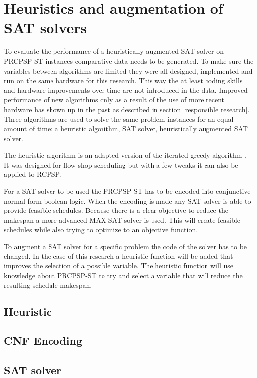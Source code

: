 \section{Heuristics and augmentation of SAT solvers}
To evaluate the performance of a heuristically augmented SAT solver on PRCPSP-ST instances comparative data needs to be generated.  To make sure the variables between algorithms are limited they were all designed, implemented and run on the same hardware for this research. This way the at least coding skills and hardware improvements over time are not introduced in the data. Improved performance of new algorithms only as a result of the use of more recent hardware has shown up in the past as described in section \ref{responsible research}. Three algorithms are used to solve the same problem instances for an equal amount of time: a heuristic algorithm, SAT solver, heuristically augmented SAT solver.

The heuristic algorithm is an adapted version of the iterated greedy algorithm \cite{RN32}. It was designed for flow-shop scheduling but with a few tweaks it can also be applied to RCPSP.

For a SAT solver to be used the PRCPSP-ST has to be encoded into conjunctive normal form boolean logic. When the encoding is made any SAT solver is able to provide feasible schedules. Because there is a clear objective to reduce the makespan a more advanced MAX-SAT solver is used. This will create feasible schedules while also trying to optimize to an objective function.

To augment a SAT solver for a specific problem the code of the solver has to be changed. In the case of this research a heuristic function will be added that improves the selection of a possible variable. The heuristic function will use knowledge about PRCPSP-ST to try and select a variable that will reduce the resulting schedule makespan.

\subsection{Heuristic}

\subsection{CNF Encoding}




\subsection{SAT solver}
